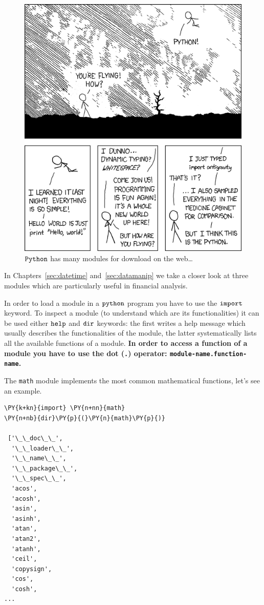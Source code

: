 \begin{figure}
\centering
\includegraphics[width=0.5\linewidth]{figures/python.png}
\caption{$\tt{Python}$ has many modules for download on the web\ldots{}}
\label{fig:fancy_module}
\end{figure}

In Chapters~\ref{sec:datetime} and~\ref{sec:datamanip} we take a closer look at three modules which are particularly 
useful in financial analysis.

In order to load a module in a \(\tt{python}\) program you have to use the \(\tt{import}\) keyword. 
To inspect a module (to understand which are its functionalities) it can be used either 
\(\tt{help}\) and \(\tt{dir}\) keywords: the first writes a help message which usually describes 
the functionalities of the module, the latter systematically lists all the available functions of a module.
\textbf{In order to access a function of a module you have to use the dot (\texttt{.}) operator: 
\texttt{module-name.function-name}.}

The \texttt{math} module implements the most common mathematical functions, let's see an example. 

\begin{codebox}            
\begin{Verbatim}[commandchars=\\\{\}]
\PY{k+kn}{import} \PY{n+nn}{math}
\PY{n+nb}{dir}\PY{p}{(}\PY{n}{math}\PY{p}{)}

 ['\_\_doc\_\_',
  '\_\_loader\_\_',
  '\_\_name\_\_',
  '\_\_package\_\_',
  '\_\_spec\_\_',
  'acos',
  'acosh',
  'asin',
  'asinh',
  'atan',
  'atan2',
  'atanh',
  'ceil',
  'copysign',
  'cos',
  'cosh',
...
\end{Verbatim}
\end{codebox}

